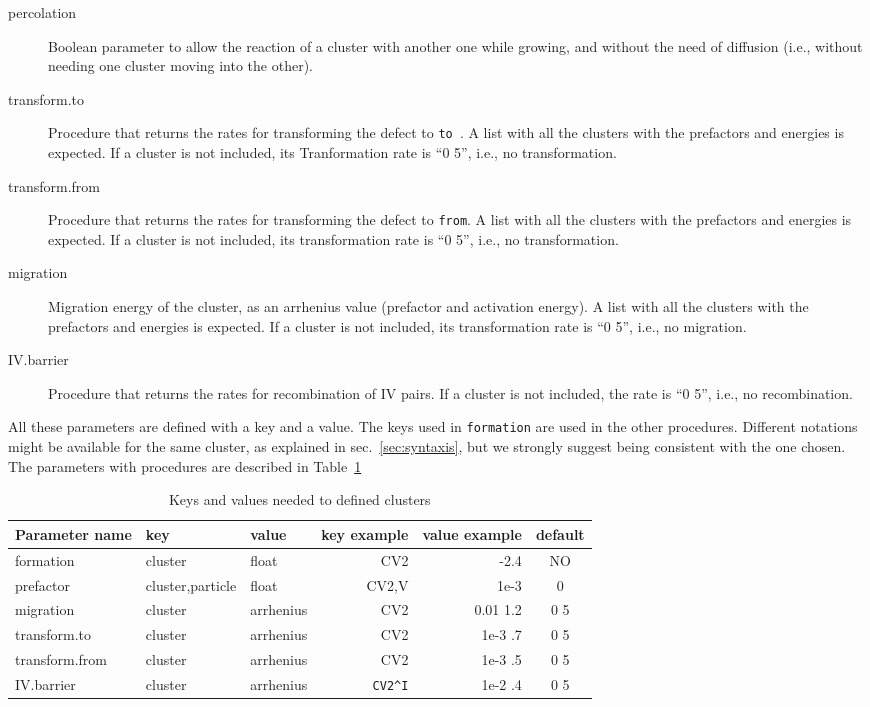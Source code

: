 \begin{description}
\item [percolation] Boolean parameter to allow the reaction of a cluster with another one while growing, and without the need of diffusion (i.e., without needing one cluster moving into the other).

\item [transform.to] Procedure that returns the rates for transforming the defect to {\tt to }. A list with all the clusters with the prefactors and energies is expected. If a cluster is not included, its Tranformation rate is ``0 5'', i.e., no transformation.

\item [transform.from] Procedure that returns the rates for transforming the defect to {\tt from}.  A list with all the clusters with the prefactors and energies is expected. If a cluster is not included, its transformation rate is ``0 5'', i.e., no transformation.

\item [migration] Migration energy of the cluster, as an arrhenius value (prefactor and activation energy).  A list with all the clusters with the prefactors and energies is expected. If a cluster is not included, its transformation rate is ``0 5'', i.e., no migration.

\item[IV.barrier] Procedure that returns the rates for recombination of IV pairs. If a cluster is not included, the rate is ``0 5'', i.e., no recombination.

\end{description}

All these parameters are defined with a key and a value. The keys used in {\tt formation} are used in the other procedures. Different notations might be available for the same cluster, as explained in sec.~\ref{sec:syntaxis}, but we strongly suggest being consistent with the one chosen. The parameters with procedures are described in Table~\ref{tab:multicluster}

\begin{table}
\caption{Keys and values needed to defined clusters}
\label{tab:multicluster}
\begin{tabular} {l|ll|rr|c}
\hline
Parameter name & key              & value     & key example   & value example & default\\\hline
formation      & cluster          & float     & CV2           & -2.4          & NO \\
prefactor      & cluster,particle & float     & CV2,V         & 1e-3          & 0 \\
migration      & cluster          & arrhenius & CV2           & 0.01 1.2      & 0 5\\
transform.to   & cluster          & arrhenius & CV2           & 1e-3 .7       & 0 5\\
transform.from & cluster          & arrhenius & CV2           & 1e-3 .5       & 0 5\\
IV.barrier     & cluster          & arrhenius & \verb+CV2^I+ & 1e-2 .4       & 0 5\\
\end{tabular}
\end{table}

